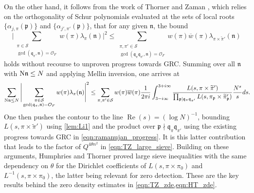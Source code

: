 \documentclass[11pt]{amsart}
\theoremstyle{remark}
\numberwithin{equation}{section}
\newcommand{\kp}{\mathfrak{p}}
\newcommand{\n}{\mathfrak{n}}
\newcommand{\kn}{\mathfrak{n}}
\newcommand{\kq}{\mathfrak{q}}
\newcommand{\N}{\textnormal{N}}
\newcommand{\mO}{\mathcal{O}}
\newcommand{\mS}{\mathcal{S}}
\renewcommand{\bar}{\overline}
\newcommand{\re}{\mathop{\mathrm{Re}}}
\begin{document}
On the other hand, it follows from the work of Thorner and Zaman \cite[Section 4.2]{TZ_GLn}, which relies on the orthogonality of Schur polynomials evaluated at the sets of local roots $\{\alpha_{j,\pi}(\kp)\}$ and $\{\alpha_{j',\pi'}(\kp)\}$, that for any given $\kn$, the bound
\begin{equation}
\label{eqn:approximation2}
    \Bigg| \sum_{\substack{\pi \in \mS \\ \gcd(\kq_\pi, \kn) = \mO_F}} w(\pi) \lambda_\pi(\n) \Bigg|^2 
   \leq 
    \sum_{\substack{\pi, \pi' \in \mS \\ \gcd(\kq_\pi \kq_{\pi'}, \kn) = \mO_F}} w(\pi) \bar w(\pi) \lambda_{\pi\times\widetilde{\pi}'}(\kn)
\end{equation}
holds without recourse to unproven progress towards GRC.  Summing over all $\kn$ with $\N\kn\leq N$ and applying Mellin inversion, one arrives at
\begin{equation}
\label{eqn:approximation3}
    \sum_{\N \n \le N} \Bigg| \sum_{\substack{\pi \in \mS \\ \gcd(\kq_{\pi}, \kn)=\mathcal{O}_F}} w(\pi) \lambda_\pi(\n) \Bigg|^2 
   \leq 
    \sum_{\pi, \pi' \in \mS} w(\pi) \bar w(\pi) \frac{1}{2\pi i}\int_{3-i\infty}^{3+i\infty}\frac{L(s,\pi\times\widetilde{\pi}')}{\prod_{\kp\mid\kq_{\pi}\kq_{\pi'}}L(s,\pi_{\kp}\times\widetilde{\pi}_{\kp}')}\frac{N^s}{s}ds.\hspace{-1mm}
\end{equation}
One then pushes the contour to the line $\re(s)=(\log N)^{-1}$, bounding $L(s,\pi\times\widetilde{\pi}')$ using \cref{lem:Li1} and the product over $\kp\nmid\kq_{\pi}\kq_{\pi'}$ using the existing progress towards GRC in \eqref{eqn:ramanujan_progress}.  It is this latter contribution that leads to the factor of $Q^{4\theta n^2}$ in \eqref{eqn:TZ_large_sieve}. Building on these arguments, Humphries and Thorner \cite[Theorem 4.1]{humphries2024zeros} proved large sieve inequalities with the same dependency on $\theta$ for the Dirichlet coefficients of $L(s, \pi \times \pi_0)$ and $L^{-1}(s, \pi \times \pi_0)$, the latter being relevant for zero detection. These are the key results behind the zero density estimates in \cref{eqn:TZ_zde,eqn:HT_zde}.
\end{document}
